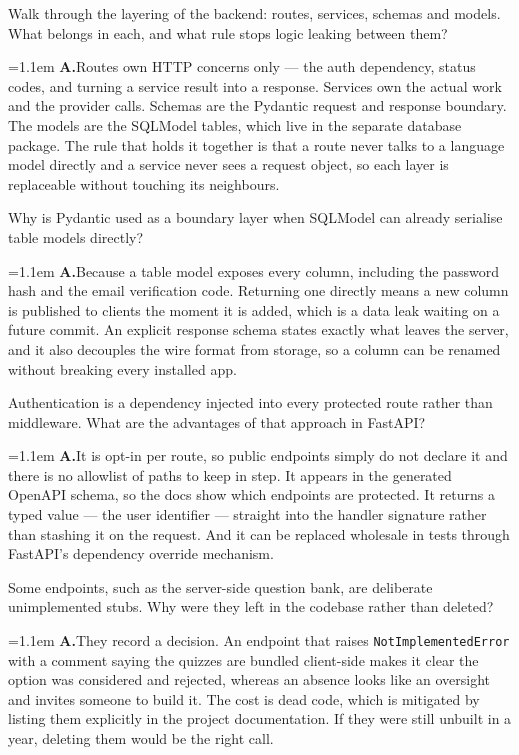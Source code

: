 \documentclass[11pt,a4paper]{article}
\newcommand{\code}[1]{\texttt{\small #1}}
\newcommand{\ans}[1]{%
  \par\vspace{0.32em}%
  \begingroup
  \small\color{answerink}%
  \leftskip=1.1em
  \noindent\textbf{\color{accent}A.}\hspace{0.45em}#1\par
  \endgroup
  \vspace{0.1em}%
}
\begin{document}
\begin{questions}[resume]

\item Walk through the layering of the backend: routes, services, schemas and
models. What belongs in each, and what rule stops logic leaking between them?
\ans{Routes own HTTP concerns only --- the auth dependency, status codes, and
turning a service result into a response. Services own the actual work and the
provider calls. Schemas are the Pydantic request and response boundary. The
models are the SQLModel tables, which live in the separate database package. The
rule that holds it together is that a route never talks to a language model
directly and a service never sees a request object, so each layer is replaceable
without touching its neighbours.}

\item Why is Pydantic used as a boundary layer when SQLModel can already serialise
table models directly?
\ans{Because a table model exposes every column, including the password hash and
the email verification code. Returning one directly means a new column is
published to clients the moment it is added, which is a data leak waiting on a
future commit. An explicit response schema states exactly what leaves the server,
and it also decouples the wire format from storage, so a column can be renamed
without breaking every installed app.}

\item Authentication is a dependency injected into every protected route rather
than middleware. What are the advantages of that approach in FastAPI?
\ans{It is opt-in per route, so public endpoints simply do not declare it and
there is no allowlist of paths to keep in step. It appears in the generated
OpenAPI schema, so the docs show which endpoints are protected. It returns a
typed value --- the user identifier --- straight into the handler signature rather
than stashing it on the request. And it can be replaced wholesale in tests
through FastAPI's dependency override mechanism.}

\item Some endpoints, such as the server-side question bank, are deliberate
unimplemented stubs. Why were they left in the codebase rather than deleted?
\ans{They record a decision. An endpoint that raises \code{NotImplementedError}
with a comment saying the quizzes are bundled client-side makes it clear the
option was considered and rejected, whereas an absence looks like an oversight
and invites someone to build it. The cost is dead code, which is mitigated by
listing them explicitly in the project documentation. If they were still unbuilt
in a year, deleting them would be the right call.}


\end{questions}
\end{document}
